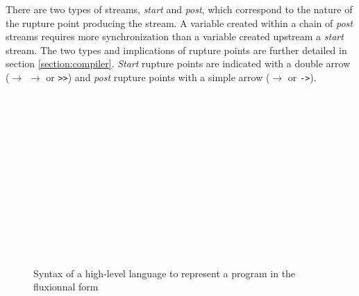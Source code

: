 There are two types of streams, \textit{start} and \textit{post}, which correspond to the nature of the rupture point producing the stream.
A variable created within a chain of \textit{post} streams requires more synchronization than a variable created upstream a \textit{start} stream.
The two types and implications of rupture points are further detailed in section \ref{section:compiler}.
\textit{Start} rupture points are indicated with a double arrow ($\to$ \hspace{-1.4em} $\to$ or \texttt{>>}) and \textit{post} rupture points with a simple arrow ($\to$ or \texttt{->}).

\begin{figure}[h]
\vspace{-0.6\baselineskip}
\begin{bnf*}
      { \bnfor {} \bnfsp {} \bnfsp {}}\\
          { \bnfsp {} \bnfsp {} \bnfsp {} \bnfsp {} \bnfsp {} \bnfsp {} \bnfsp {}}\\
         {\bnfts{\texttt{\&}} \bnfsp {} \bnfor {}}\\
      { \bnfor {} \bnfor {} \bnfsp {} \bnfsp {}}\\
       { \bnfsp {} }\\
         {}\\
          {\bnfts{\texttt{\{}}  \bnfts{\texttt{\}}}}\\
          {\bnfts{\texttt{[}}  \bnfts{\texttt{]}}}\\
         { \bnfor {} \bnfsp \bnfts{,} \bnfsp {}}\\
         {\bnfts{\texttt{>}\texttt{>}} \bnfor \bnfts{\texttt{-}\texttt{>}}}\\
           {}\\
           {  }\\
\end{bnf*}
\vspace{-2.5\baselineskip}
\caption{Syntax of a high-level language to represent a program in the fluxionnal form}
\label{fig:flx-lang}
\end{figure}


